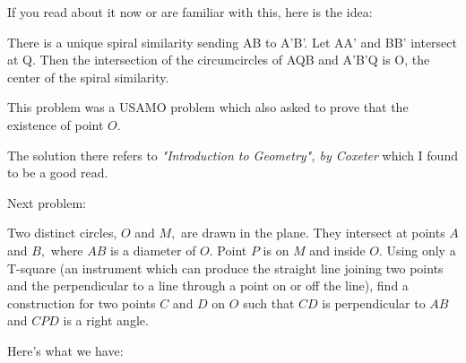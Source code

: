 If you read about it now or are familiar with this, here is the idea:

There is a unique spiral similarity sending AB to A'B'. Let AA' and BB' intersect at Q. Then the intersection of the circumcircles of AQB and A'B'Q is O, the center of the spiral similarity.

\begin{remark}
    
This problem was a USAMO problem which also asked to prove that the existence of point $O$.

The solution there refers to \emph{"Introduction to Geometry", by Coxeter} which I found to be a good read.
\end{remark}

Next problem:

\vspace{10pt}
\begin{example}
    Two distinct circles, $O$ and $M,$ are drawn in the plane. They intersect at points $A$ and $B,$ where $AB$ is a diameter of $O.$ Point $P$ is on $M$ and inside $O.$ Using only a T-square (an instrument which can produce the straight line joining two points and the perpendicular to a line through a point on or off the line), find a construction for two points $C$ and $D$ on $O$ such that $CD$ is perpendicular to $AB$ and $CPD$ is a right angle.
    
\end{example}

Here's what we have:




